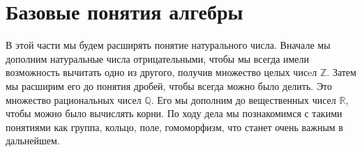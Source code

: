 \documentclass[a5paper,10pt,pagesize,DIV=classic]{scrbook}
\theoremstyle{plain}
\theoremstyle{definition}
\begin{document}






%






%


\chapter{Базовые понятия алгебры}
В этой части мы будем расширять понятие натурального числа. Вначале мы дополним натуральные числа отрицательными, чтобы мы всегда имели возможность вычитать одно из другого, получив множество целых чисeл $\mathbb{Z}$. Затем мы расширим его до понятия дробей, чтобы всегда можно было делить. Это множество рациональных чисел $\mathbb{Q}$. Его мы дополним до вещественных чисел $\mathbb{R}$, чтобы можно было вычислять корни. По ходу дела мы познакомимся с такими понятиями как группа, кольцо, поле, гомоморфизм, что станет очень важным в дальнейшем.



\end{document}
